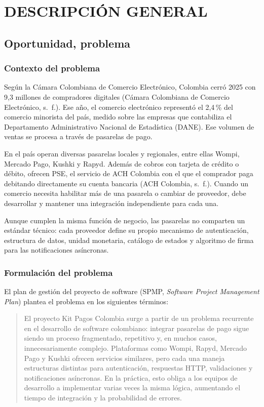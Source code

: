 \setcounter{subsection}{0}
\section{DESCRIPCIÓN GENERAL}
\sloppy

\subsection{Oportunidad, problema}

\subsubsection{Contexto del problema}
Según la Cámara Colombiana de Comercio Electrónico, Colombia cerró 2025 con 9,3 millones de compradores digitales (Cámara Colombiana de Comercio Electrónico, s.~f.). Ese año, el comercio electrónico representó el 2,4\,\% del comercio minorista del país, medido sobre las empresas que contabiliza el Departamento Administrativo Nacional de Estadística (DANE). Ese volumen de ventas se procesa a través de pasarelas de pago.

En el país operan diversas pasarelas locales y regionales, entre ellas Wompi, Mercado Pago, Kushki y Rapyd. Además de cobros con tarjeta de crédito o débito, ofrecen PSE, el servicio de ACH Colombia con el que el comprador paga debitando directamente su cuenta bancaria (ACH Colombia, s.~f.). Cuando un comercio necesita habilitar más de una pasarela o cambiar de proveedor, debe desarrollar y mantener una integración independiente para cada una.

Aunque cumplen la misma función de negocio, las pasarelas no comparten un estándar técnico: cada proveedor define su propio mecanismo de autenticación, estructura de datos, unidad monetaria, catálogo de estados y algoritmo de firma para las notificaciones asíncronas.

\subsubsection{Formulación del problema}
El plan de gestión del proyecto de software (SPMP, \textit{Software Project Management Plan}) plantea el problema en los siguientes términos:

\begin{quote}
El proyecto Kit Pagos Colombia surge a partir de un problema recurrente en el desarrollo de software colombiano: integrar pasarelas de pago sigue siendo un proceso fragmentado, repetitivo y, en muchos casos, innecesariamente complejo. Plataformas como Wompi, Rapyd, Mercado Pago y Kushki ofrecen servicios similares, pero cada una maneja estructuras distintas para autenticación, respuestas HTTP, validaciones y notificaciones asíncronas. En la práctica, esto obliga a los equipos de desarrollo a implementar varias veces la misma lógica, aumentando el tiempo de integración y la probabilidad de errores.
\end{quote}

